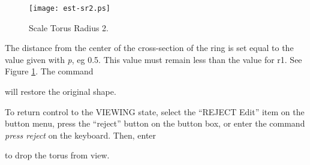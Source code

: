 \begin{figure}
\centering \texttt{[image: est-sr2.ps]}
\caption{Scale Torus Radius 2.}
\label{est-sr2}
\end{figure}


The distance from the center of the cross-section of the ring is set equal
to the value given with {\em p}, eg 0.5.
This value must remain less than the value for r1.
See Figure \ref{est-sr2}.
The command


will restore the original shape.

To return control to the VIEWING state, select the ``REJECT Edit''
item on the button menu, press the ``reject'' button on the button box,
or enter the command {\em press reject} on the keyboard.
Then, enter


to drop the torus from view.

